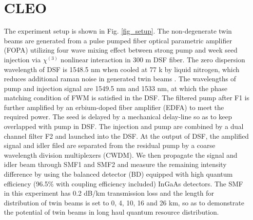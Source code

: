 \documentclass[9pt,twocolumn,twoside]{osajnl}
\begin{document}
\section{CLEO}
The experiment setup is shown in Fig. \ref{fig_setup}.
The non-degenerate twin beams are generated from a pulse pumped fiber optical parametric amplifier (FOPA) utilizing four wave mixing effect between strong pump and week seed injection via \(\chi^{(3)} \) nonlinear interaction in 300 m DSF fiber.
The zero dispersion wavelength of DSF is 1548.5 nm when cooled at 77 k by liquid nitrogen, which reduces additional raman noise in generated twin beams \cite{guo12}.
The wavelengths of pump and injection signal  are 1549.5 nm and 1533 nm, at which the phase matching condition of FWM is satisfied in the DSF.
The filtered pump after F1 is further amplified by an erbium-doped fiber amplifier (EDFA) to meet the required power.
The seed is delayed by a mechanical delay-line so as to keep overlapped with pump in DSF.
The injection and pump are combined by a dual channel filter F2 and launched into the DSF.
At the output of DSF, the amplified signal and idler filed are separated from the residual pump by a coarse wavelength division multiplexers (CWDM).
We then propagate the signal and idler beam through SMF1 and SMF2 and measure the remaining intensity difference by using the balanced detector (BD) equipped with high quantum efficiency (96.5\% with coupling efficiency included) InGaAs detectors.
The SMF in this experiment has 0.2 dB/km transmission loss and the length for distribution of twin beams is set to 0, 4, 10, 16 and 26 km, so as to demonstrate the potential of twin beams in long haul quantum resource distribution.



\end{document}
